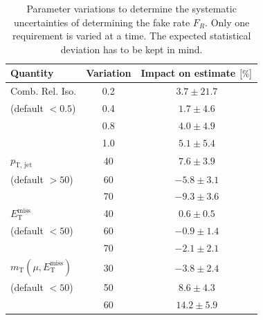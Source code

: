 \begin{table}[htb!]
  \centering
  \begin{tabular}{|l|c|c|}
    \hline
    Quantity                                        & Variation & Impact on estimate $[\pct]$ \\
    \hline
    \hline
    Comb. Rel. Iso.                                 & 0.2       & $3.7 \pm 21.7$              \\
    (default $< 0.5$)                               & 0.4       & $1.7 \pm 4.6$               \\
    & 0.8       & $4.0 \pm 4.9$               \\
    & 1.0       & $5.1 \pm 5.4$               \\
    \hline
    $p_{\text{T, jet}}$                             & 40        & $7.6 \pm 3.9$               \\
    (default $> 50$)                                & 60        & $-5.8 \pm 3.1$              \\
    & 70        & $-9.3 \pm 3.6$              \\
    \hline
    $E_{\text{T}}^{\text{miss}}$                    & 40        & $0.6 \pm 0.5$               \\
    (default $< 50$)                                & 60        & $-0.9 \pm 1.4$              \\
    & 70        & $-2.1 \pm 2.1$              \\
    \hline
    $m_{\text{T}}(\mu, E_{\text{T}}^{\text{miss}})$ & 30        & $-3.8 \pm 2.4$              \\
    (default $< 50$)                                & 50        & $8.6 \pm 4.3$               \\
    & 60        & $14.2 \pm 5.9$              \\
    \hline
  \end{tabular}
  \caption{Parameter variations to determine the systematic uncertainties of determining the fake rate $F_R$. Only one requirement is varied at a time. The expected statistical deviation has to be kept in mind.}
  \label{tab:tlratiosys}
\end{table}

